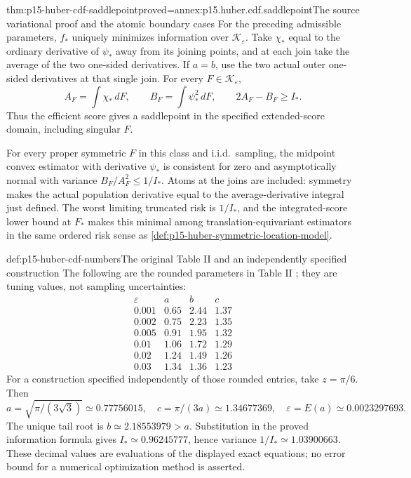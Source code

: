 \begin{hbtheorem}{thm:p15-huber-cdf-saddlepoint}{proved=annex:p15.huber.cdf.saddlepoint}{The source variational proof and the atomic boundary cases}
For the preceding admissible parameters, \(f_*\) uniquely minimizes
information over \(\mathcal K_\varepsilon\).
Take \(\chi_*\) equal to the ordinary derivative of \(\psi_*\)
away from its joining points, and at each join take the average
of the two one-sided derivatives. If \(a=b\), use the two actual
outer one-sided derivatives at that single join.
For every \(F\in\mathcal K_\varepsilon\),
\[
 A_F=\int\chi_*\,dF,\qquad B_F=\int\psi_*^2\,dF,\qquad
                   2A_F-B_F\geq I_* .
\]
Thus the efficient score gives a saddlepoint in the specified
extended-score domain, including singular \(F\).

For every proper symmetric \(F\) in this class and i.i.d.\ sampling,
the midpoint convex estimator with derivative \(\psi_*\) is
consistent for zero and asymptotically normal with variance
\(B_F/A_F^2\leq1/I_*\). Atoms at the joins are included:
symmetry makes the actual population derivative equal to the
average-derivative integral just defined.
The worst limiting truncated risk is \(1/I_*\), and the
integrated-score lower bound at \(F_*\) makes this minimal among
translation-equivariant estimators in the same ordered risk sense
as \cref{def:p15-huber-symmetric-location-model}.
\end{hbtheorem}

\begin{hbexample}{def:p15-huber-cdf-numbers}{The original Table II and an independently specified construction}
The following are the rounded parameters in Table II
\cite[p.~92]{Huber1964RobustLocation}; they are tuning values,
not sampling uncertainties:
\[
\begin{array}{c|rrr}
\varepsilon&a&b&c\\\hline
0.001&0.65&2.44&1.37\\
0.002&0.75&2.23&1.35\\
0.005&0.91&1.95&1.32\\
0.01&1.06&1.72&1.29\\
0.02&1.24&1.49&1.26\\
0.03&1.34&1.36&1.23
\end{array}
\]
For a construction specified independently of those rounded entries,
take \(z=\pi/6\). Then
\[
 a=\sqrt{\pi/(3\sqrt3)}\simeq0.77756015,\quad
 c=\pi/(3a)\simeq1.34677369,\quad
 \varepsilon=E(a)\simeq0.0023297693 .
\]
The unique tail root is \(b\simeq2.18553979>a\).
Substitution in the proved information formula gives
\(I_*\simeq0.96245777\), hence variance \(1/I_*\simeq1.03900663\).
These decimal values are evaluations of the displayed exact equations;
no error bound for a numerical optimization method is asserted.
\end{hbexample}

